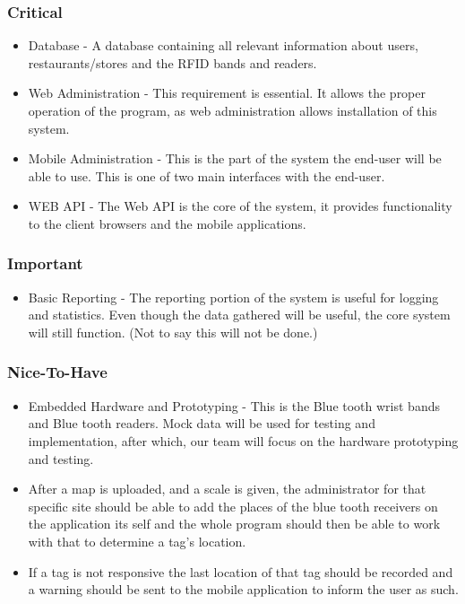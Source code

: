 \documentclass[11pt,titlepage]{article} %
\begin{document}
	\subsubsection{Critical}
\begin{itemize}
\item Database - A database containing all relevant information about users, restaurants/stores and the RFID bands and readers.
\item Web Administration - This requirement is essential. It allows the proper operation of the program, as web administration allows installation of this system.
\item Mobile Administration - This is the part of the system the end-user will be able to use. This is one of two main interfaces with the end-user.
\item WEB API - The Web API is the core of the system, it provides functionality to the client browsers and the mobile applications.
\end{itemize}

	\subsubsection{Important}
\begin{itemize}
\item Basic Reporting - The reporting portion of the system is useful for logging and statistics. Even though the data gathered will be useful, the core system will still function. (Not to say this will not be done.)
\end{itemize}

	\subsubsection{Nice-To-Have}
\begin{itemize}
\item Embedded Hardware and Prototyping - This is the Blue tooth wrist bands and Blue tooth readers. Mock data will be used for testing and implementation, after which, our team will focus on the hardware prototyping and testing.

\item After a map is uploaded, and a scale is given, the administrator for that specific site should be able to add the places of the blue tooth receivers on the application its self and the whole program should then be able to work with that to determine a tag's location.

\item If a tag is not responsive the last location of that tag should be recorded and a warning should be sent to the mobile application to inform the user as such.


\end{itemize}
\end{document}
